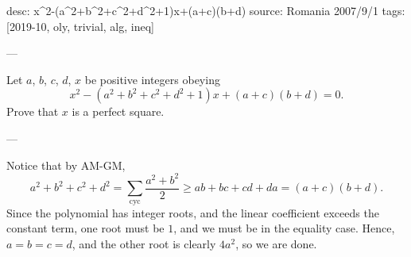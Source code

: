 desc: x^2-(a^2+b^2+c^2+d^2+1)x+(a+c)(b+d)
source: Romania 2007/9/1
tags: [2019-10, oly, trivial, alg, ineq]

---

Let $a$, $b$, $c$, $d$, $x$ be positive integers obeying \[x^2-\left(a^2+b^2+c^2+d^2+1\right)x+(a+c)(b+d)=0.\]
Prove that $x$ is a perfect square.

---

Notice that by AM-GM, \[a^2+b^2+c^2+d^2=\sum_\mathrm{cyc}\frac{a^2+b^2}2\ge ab+bc+cd+da=(a+c)(b+d).\]
Since the polynomial has integer roots, and the linear coefficient exceeds the constant term, one root must be $1$, and we must be in the equality case. Hence, $a=b=c=d$, and the other root is clearly $4a^2$, so we are done.
